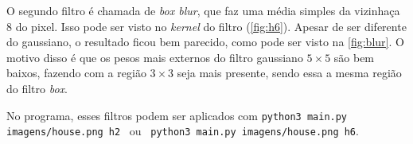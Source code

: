 O segundo filtro é chamada de \textit{box blur}, que faz uma média simples da vizinhaça 8 do pixel. Isso pode ser visto no \textit{kernel} do filtro (\cref{fig:h6}). Apesar de ser diferente do gaussiano, o resultado ficou bem parecido, como pode ser visto na \cref{fig:blur}. O motivo disso é que os pesos mais externos do filtro gaussiano $5 \times 5$ são bem baixos, fazendo com a região $3 \times 3$ seja mais presente, sendo essa a mesma região do filtro \textit{box}.

No programa, esses filtros podem ser aplicados com \texttt{python3 main.py imagens/house.png h2} ~ou~ \texttt{python3 main.py imagens/house.png h6}.
